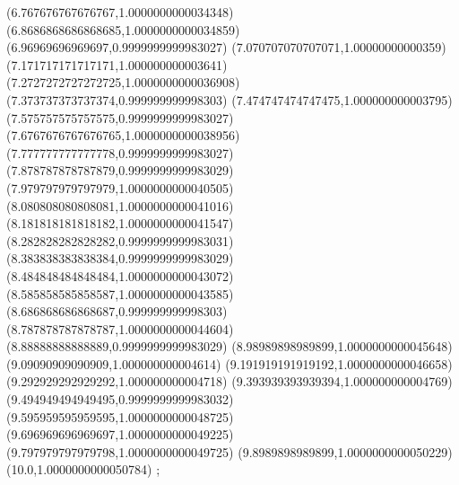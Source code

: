 {(6.767676767676767,1.0000000000034348)
(6.8686868686868685,1.0000000000034859)
(6.96969696969697,0.9999999999983027)
(7.070707070707071,1.00000000000359)
(7.171717171717171,1.000000000003641)
(7.2727272727272725,1.0000000000036908)
(7.373737373737374,0.999999999998303)
(7.474747474747475,1.000000000003795)
(7.575757575757575,0.9999999999983027)
(7.6767676767676765,1.0000000000038956)
(7.777777777777778,0.9999999999983027)
(7.878787878787879,0.9999999999983029)
(7.979797979797979,1.0000000000040505)
(8.080808080808081,1.0000000000041016)
(8.181818181818182,1.0000000000041547)
(8.282828282828282,0.9999999999983031)
(8.383838383838384,0.9999999999983029)
(8.484848484848484,1.0000000000043072)
(8.585858585858587,1.0000000000043585)
(8.686868686868687,0.999999999998303)
(8.787878787878787,1.0000000000044604)
(8.88888888888889,0.9999999999983029)
(8.98989898989899,1.0000000000045648)
(9.09090909090909,1.000000000004614)
(9.191919191919192,1.0000000000046658)
(9.292929292929292,1.000000000004718)
(9.393939393939394,1.000000000004769)
(9.494949494949495,0.9999999999983032)
(9.595959595959595,1.0000000000048725)
(9.696969696969697,1.0000000000049225)
(9.797979797979798,1.0000000000049725)
(9.8989898989899,1.0000000000050229)
(10.0,1.0000000000050784)
};
